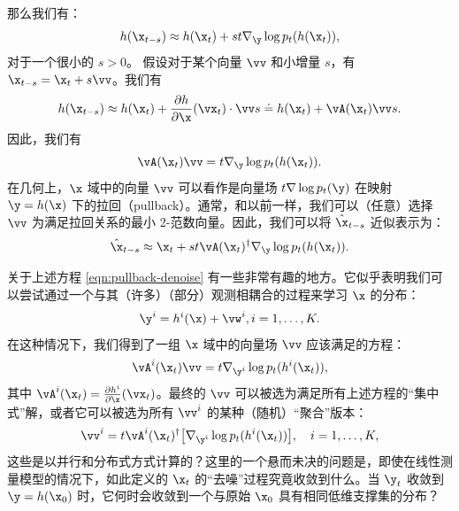 \documentclass[../../book-main_zh.tex]{subfiles}
\begin{document}
那么我们有：
\begin{equation}
    h(\x_{t-s}) \approx h(\x_t) + st \nabla_{\y} \log p_t(h(\x_t)),
\end{equation}
对于一个很小的 $s >0$。
假设对于某个向量 $\vv$ 和小增量 $s$，有 $\x_{t-s} = \x_t + s \vv$。我们有
\begin{equation}
    h(\x_{t-s}) \approx h(\x_t) + \frac{\partial h}{\partial
    \x}(\vx_{t}) \cdot \vv s \doteq h(\x_t) + \vA(\x_t) \vv s.
\end{equation}
因此，我们有
\begin{equation}
    \vA(\x_t) \vv = t \nabla_{\y} \log p_t(h(\x_t)).
    \label{eqn:pushforward}
\end{equation}
在几何上，$\x$ 域中的向量 $\vv$ 可以看作是向量场 $t \nabla \log p_t(\y)$ 在映射 $\y = h(\x)$ 下的拉回（pullback）。通常，和以前一样，我们可以（任意）选择 $\vv$ 为满足拉回关系的最小 2-范数向量。因此，我们可以将 $\hat{\x}_{t-s}$ 近似表示为：
\begin{equation}
    \hat{\x}_{t-s} \approx \x_t + st\vA(\x_t)^\dagger \nabla_{\y}
    \log p_t(h(\x_t)).
    \label{eqn:pullback-denoise}
\end{equation}

\begin{remark}[并行传感与分布式去噪。]
    {关于上述方程 \eqref{eqn:pullback-denoise} 有一些非常有趣的地方。它似乎表明我们可以尝试通过一个与其（许多）（部分）观测相耦合的过程来学习 $\x$ 的分布：
        \begin{equation}
            \y^i = h^i(\x) +\vw^i, i =1, \ldots, K.
        \end{equation} 在这种情况下，我们得到了一组 $\x$ 域中的向量场 $\vv$ 应该满足的方程：
        \begin{equation}
            \vA^i(\x_t) \vv = t \nabla_{\y^i} \log p_t(h^i(\x_t)),
            \label{eqn:federated-pushforward}
        \end{equation}
        其中 $\vA^i(\x_t) = \frac{\partial h^i}{\partial
        \x}(\vx_t)$。最终的 $\vv$ 可以被选为满足所有上述方程的“集中式”解，或者它可以被选为所有 $\vv^i$ 的某种（随机）“聚合”版本：
        \begin{equation}
            \vv^i = t\vA^i(\x_t)^\dagger \big[\nabla_{\y^i} \log
            p_t(h^i(\x_t))\big], \quad i = 1, \ldots, K,
        \end{equation}
        这些是以并行和分布式方式计算的？这里的一个悬而未决的问题是，即使在线性测量模型的情况下，如此定义的 $\x_t$ 的“去噪”过程究竟收敛到什么。当 $\y_t$ 收敛到 $\y = h(\x_0)$ 时，它何时会收敛到一个与原始 $\x_0$ 具有相同低维支撑集的分布？ }
\end{remark}
\end{document}
